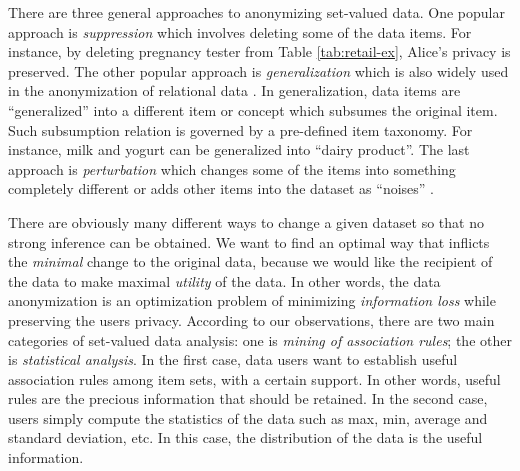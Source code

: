 There are three general approaches to anonymizing set-valued data. One
popular approach is {\em suppression} which involves deleting some of the
data items. For instance, by deleting pregnancy tester from Table
\ref{tab:retail-ex}, Alice's privacy is preserved.
The other popular approach is {\em generalization} which is also
widely used in the anonymization of relational data
\cite{Sweeney2002:k-anonymity}. In generalization, data items are
``generalized'' into a different item or concept which subsumes the original
item. Such subsumption relation is governed by a pre-defined item taxonomy.
For instance, milk and yogurt can be generalized into ``dairy product''.
The last approach is {\em perturbation} which changes some of the items into
something completely different or adds other items into the dataset as
``noises'' \cite{ChenMFDX11:Diff}.

There are obviously many different ways
to change a given dataset so that no strong inference can be obtained.
We want to find an optimal way that inflicts the {\em minimal} change to
the original data, because we would like the recipient of the data to make
maximal {\em utility} of the data. In other words, the data anonymization
is an optimization problem of minimizing {\em information loss}
while preserving the users privacy. According to our observations, there are
two main categories of set-valued data analysis: one is {\em mining of
association rules}; the other is {\em statistical analysis}. In the first
case, data users want to establish useful association rules among
item sets, with a certain support. In other words, useful rules are the
precious information that should be retained.
In the second case, users simply compute the statistics of the data
such as max, min, average and standard deviation, etc. In this case,
the distribution of the data is the useful information.

